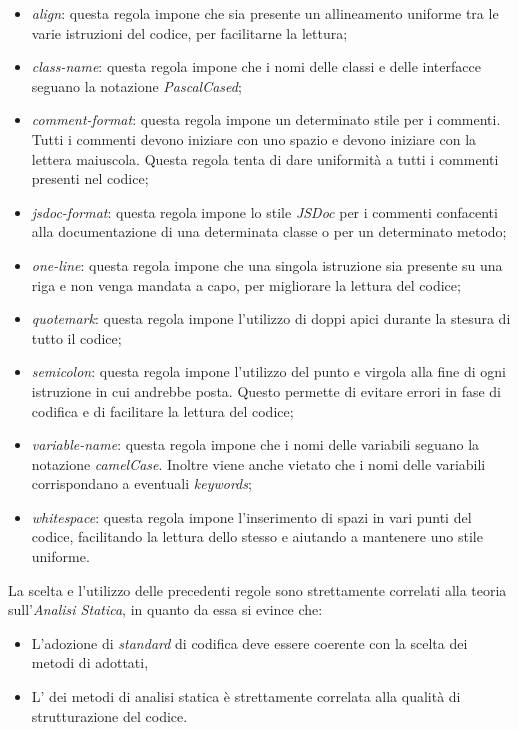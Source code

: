 \begin{itemize}
                \item \textit{align}: questa regola impone che sia presente un allineamento uniforme tra le varie istruzioni del codice, per facilitarne la lettura;
                \item \textit{class-name}: questa regola impone che i nomi delle classi e delle interfacce seguano la notazione \textit{PascalCased};
                \item \textit{comment-format}: questa regola impone un determinato stile per i commenti. Tutti i commenti devono iniziare con uno spazio e devono iniziare con la lettera maiuscola. Questa regola tenta di dare uniformit\`a a tutti i commenti presenti nel codice;
                \item \textit{jsdoc-format}: questa regola impone lo stile \textit{JSDoc} per i commenti confacenti alla documentazione di una determinata classe o per un determinato metodo;
                \item \textit{one-line}: questa regola impone che una singola istruzione sia presente su una riga e non venga mandata a capo, per migliorare la lettura del codice;
                \item \textit{quotemark}: questa regola impone l'utilizzo di doppi apici durante la stesura di tutto il codice;
                \item \textit{semicolon}: questa regola impone l'utilizzo del punto e virgola alla fine di ogni istruzione in cui andrebbe posta. Questo permette di evitare errori in fase di codifica e di facilitare la lettura del codice;
                \item \textit{variable-name}: questa regola impone che i nomi delle variabili seguano la notazione \textit{camelCase}. Inoltre viene anche vietato che i nomi delle variabili corrispondano a eventuali \textit{keywords};
                  \item \textit{whitespace}: questa regola impone l'inserimento di spazi in vari punti del codice, facilitando la lettura dello stesso e aiutando a mantenere uno stile uniforme.
                \end{itemize}

                
                La scelta e l'utilizzo delle precedenti regole sono strettamente correlati alla teoria sull'\textit{Analisi Statica}, in quanto da essa si evince che:
                \begin{itemize}
		  \item L’adozione di \textit{standard} di codifica deve essere coerente con la scelta dei metodi di  adottati,         
		  \item L’ dei metodi di analisi statica \`e strettamente correlata alla qualit\`a di strutturazione del codice.
                \end{itemize}

